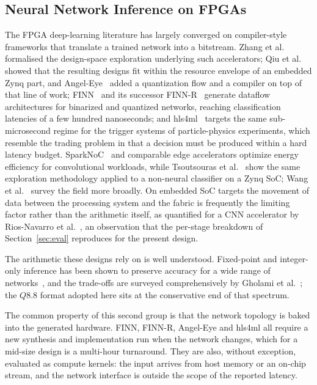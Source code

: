 \documentclass[final,5p,times,twocolumn]{elsarticle}
\begin{document}
\subsection{Neural Network Inference on FPGAs}
The FPGA deep-learning literature has largely converged on compiler-style
frameworks that translate a trained network into a bitstream. Zhang et
al.~\cite{Zhang2015} formalised the design-space exploration underlying such
accelerators; Qiu et al.~\cite{Qiu2016} showed that the resulting designs fit
within the resource envelope of an embedded Zynq part, and Angel-Eye~\cite{Guo2018}
added a quantization flow and a compiler on top of that line of work; FINN~\cite{Umuroglu2017} and its successor
FINN-R~\cite{Blott2018} generate dataflow architectures for binarized and
quantized networks, reaching classification latencies of a few hundred
nanoseconds; and hls4ml~\cite{Duarte2018} targets the same sub-microsecond
regime for the trigger systems of particle-physics experiments, which resemble
the trading problem in that a decision must be produced within a hard latency
budget. SparkNoC~\cite{sparknoc} and comparable edge accelerators optimize
energy efficiency for convolutional workloads, while
Tsoutsouras et al.~\cite{Tsoutsouras2017} show the same
exploration methodology applied to a non-neural classifier on a Zynq SoC;
Wang et al.~\cite{Wang2019survey} survey the field more broadly.
On embedded SoC targets the movement of data between the processing system and
the fabric is frequently the limiting factor rather than the arithmetic itself,
as quantified for a CNN accelerator by Rios-Navarro et
al.~\cite{RiosNavarro2018}, an observation that the per-stage breakdown of
Section~\ref{sec:eval} reproduces for the present design.

The arithmetic these designs rely on is well understood. Fixed-point and
integer-only inference has been shown to preserve accuracy for a wide range of
networks~\cite{Jacob2018,Hubara2017}, and the trade-offs are surveyed
comprehensively by Gholami et al.~\cite{Gholami2021}; the $Q8.8$ format adopted
here sits at the conservative end of that spectrum.

The common property of this second group is that the network topology is baked
into the generated hardware. FINN, FINN-R, Angel-Eye and hls4ml all require a
new synthesis and implementation run when the network changes, which for a
mid-size design is a multi-hour turnaround. They are also, without exception,
evaluated as compute kernels: the input arrives from host memory or an on-chip
stream, and the network interface is outside the scope of the reported latency.
\end{document}
